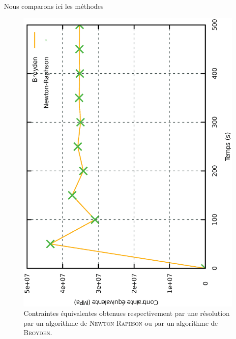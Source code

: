 \documentclass[rectoverso,pleiades,pstricks,leqno,anti]{texmf/note_technique_2010}
\begin{document}
Nous comparons ici les méthodes 

\begin{figure}[htbp]
  \centering
  \includegraphics[height=0.8\linewidth,angle=-90]{Images/CompSeq.eps}
  \caption{Contraintes équivalentes obtenues respectivement par une
    résolution par un algorithme de \textsc{Newton-Raphson} ou par un
    algorithme de \textsc{Broyden}.}
  \label{fig:CompVMis}
\end{figure}
\end{document}
